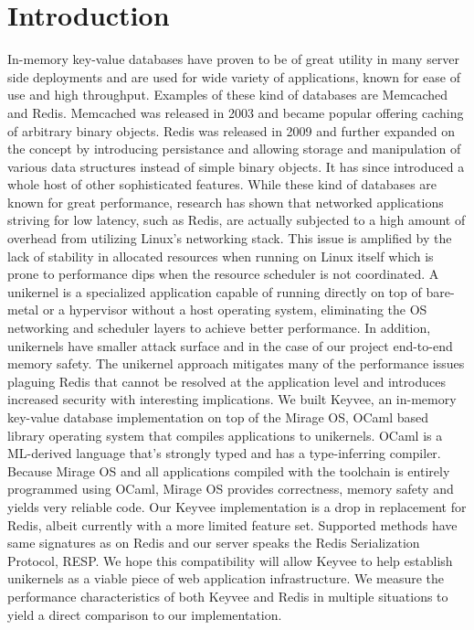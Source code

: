 \documentclass[english,10pt,twocolumn]{article}
\begin{document}
\section{Introduction}
In-memory key-value databases have proven to be of great utility in many server side deployments and are used for wide variety of applications, known for ease of use and high throughput.
Examples of these kind of databases are Memcached and Redis.
Memcached was released in 2003 and became popular offering caching of arbitrary binary objects.
Redis was released in 2009 and further expanded on the concept by introducing persistance and allowing storage and manipulation of various data structures instead of simple binary objects.
It has since introduced a whole host of other sophisticated features.
While these kind of databases are known for great performance, research has shown that networked applications striving for low latency, such as Redis, are actually subjected to a high amount of overhead from utilizing Linux's networking stack.\cite{arrakis}
This issue is amplified by the lack of stability in allocated resources when running on Linux itself which is prone to performance dips when the resource scheduler is not coordinated.
A unikernel is a specialized application capable of running directly on top of bare-metal or a hypervisor without a host operating system, eliminating the OS networking and scheduler layers to achieve better performance.
In addition, unikernels have smaller attack surface and in the case of our project end-to-end memory safety.
The unikernel approach mitigates many of the performance issues plaguing Redis that cannot be resolved at the application level and introduces increased security with interesting implications.
We built Keyvee, an in-memory key-value database implementation on top of the Mirage OS\cite{mirage}, OCaml based library operating system that compiles applications to unikernels.
OCaml is a ML-derived language that's strongly typed and has a type-inferring compiler.
Because Mirage OS and all applications compiled with the toolchain is entirely programmed using OCaml, Mirage OS provides correctness, memory safety and yields very reliable code.
Our Keyvee implementation is a drop in replacement for Redis, albeit currently with a more limited feature set.
Supported methods have same signatures as on Redis and our server speaks the Redis Serialization Protocol\cite{redis-protocol}, RESP.
We hope this compatibility will allow Keyvee to help establish unikernels as a viable piece of web application infrastructure.
We measure the performance characteristics of both Keyvee and Redis in multiple situations to yield a direct comparison to our implementation.
\end{document}
